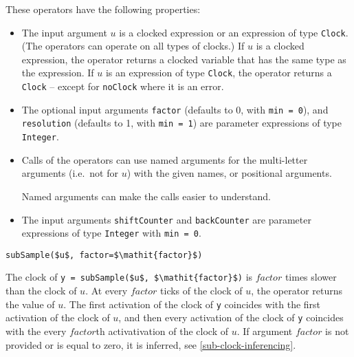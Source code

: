 These operators have the following properties:
\begin{itemize}
\item
  The input argument $u$ is a clocked expression or an expression of type \lstinline!Clock!.  (The operators can operate on all types of clocks.)  If $u$ is a clocked expression, the operator returns a clocked variable that has the same type as the expression.  If $u$ is an expression of type \lstinline!Clock!, the operator returns a \lstinline!Clock! -- except for \lstinline!noClock! where it is an error.
\item
  The optional input arguments \lstinline!factor! (defaults to 0, with \lstinline!min = 0!), and \lstinline!resolution! (defaults to 1, with \lstinline!min = 1!) are parameter expressions of type \lstinline!Integer!.
\item
  Calls of the operators can use named arguments for the multi-letter arguments (i.e.\ not for $u$) with the given names, or positional arguments.
\begin{nonnormative}
Named arguments can make the calls easier to understand.
\end{nonnormative}
\item
  The input arguments \lstinline!shiftCounter! and \lstinline!backCounter! are parameter expressions of type \lstinline!Integer! with \lstinline!min = 0!.
\end{itemize}

\begin{operatordefinition}[subSample]
\begin{synopsis}\begin{lstlisting}
subSample($u$, factor=$\mathit{factor}$)
\end{lstlisting}\end{synopsis}
\begin{semantics}
The clock of \lstinline!y = subSample($u$, $\mathit{factor}$)! is $\mathit{factor}$ times slower than the clock of $u$.
At every $\mathit{factor}$ ticks of the clock of $u$, the operator returns the value of $u$.
The first activation of the clock of \lstinline!y! coincides with the first activation of the clock of $u$, and then every activation of the clock of \lstinline!y! coincides with the every $\mathit{factor}$th activativation of the clock of $u$.
If argument $\mathit{factor}$ is not provided or is equal to zero, it is inferred, see \cref{sub-clock-inferencing}.
\end{semantics}
\end{operatordefinition}

